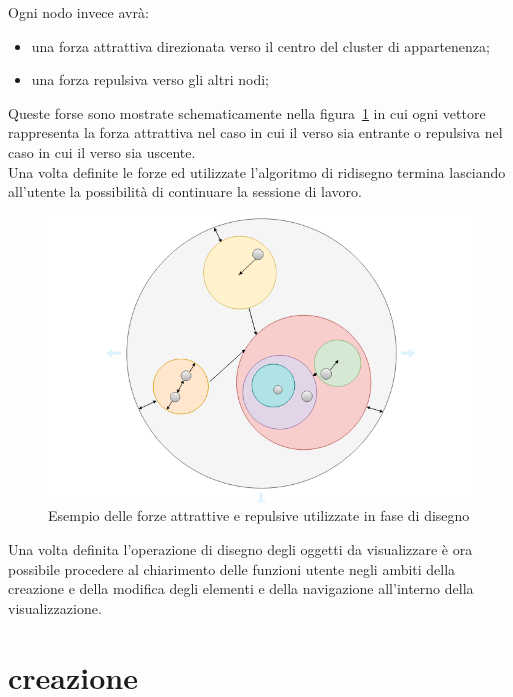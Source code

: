 {\begin{itemize}
\end{itemize}
Ogni nodo invece avrà:
\begin{itemize}
	\item una forza attrattiva direzionata verso il centro del cluster di appartenenza;
	\item una forza repulsiva verso gli altri nodi;
\end{itemize}
Queste forse sono mostrate schematicamente nella figura\figurename~\ref{fig:springExample} in cui ogni vettore rappresenta la forza attrattiva nel caso in cui il verso sia entrante o repulsiva nel caso in cui il verso sia uscente.\\
Una volta definite le forze ed utilizzate l'algoritmo di ridisegno termina lasciando all'utente la possibilità di continuare la sessione di lavoro.
\begin{figure}[!htb]
	\begin{center}
		\includegraphics[width=1 \linewidth]{figure/springExample}
	\end{center}
	\caption{Esempio delle forze attrattive e repulsive utilizzate in fase di disegno \label{fig:springExample}}
\end{figure}
Una volta definita l'operazione di disegno degli oggetti da visualizzare è ora possibile procedere al chiarimento delle funzioni utente negli ambiti della creazione e della modifica degli elementi e della navigazione all'interno della visualizzazione.
\section{creazione}

}
